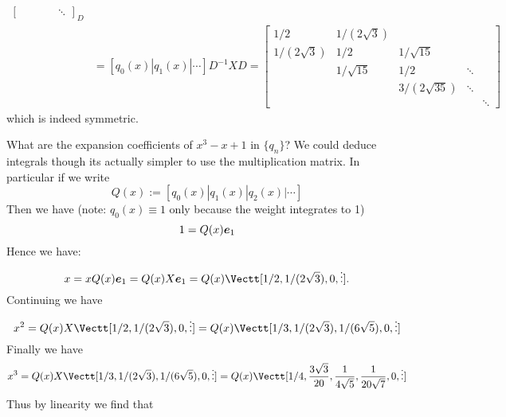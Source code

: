 \begin{example}
\begin{align*}
{\begin{bmatrix}
&&&& \ensuremath{\ddots}
\end{bmatrix}}_D \\
&= [q_0(x)| q_1(x)| \ensuremath{\cdots}] D^{-1} X D =
     \begin{bmatrix} 1/2 & 1/(2\sqrt{3}) \\
                    1/(2\sqrt{3}) & 1/2 &  1/\sqrt{15} \\
                    & 1/\sqrt{15} & 1/2 & \ensuremath{\ddots} \\
                    && 3/(2 \sqrt{35}) &  \ensuremath{\ddots} \\
                    &&& & \ensuremath{\ddots} \end{bmatrix}
\end{align*}
which is indeed symmetric.  \end{example}

\begin{example} What are the expansion coefficients of $x^3 - x + 1$ in $\{q_n\}$? We could deduce integrals though its actually simpler to use the multiplication matrix. In particular if we write
\[
Q(x) := [q_0(x) | q_1(x) | q_2(x) | \ensuremath{\cdots}]
\]
Then we have (note: $q_0(x) \ensuremath{\equiv} 1$ only because the weight integrates to 1)
\[
1 = Q(x) \bm{{\mbox{\boldmath$e$\unboldmath}}}_1
\]
Hence we have:
\[
x = x Q(x) \ensuremath{\bm{\e}}_1 = Q(x) X \ensuremath{\bm{\e}}_1 = Q(x) \Vectt[1/2, 1/(2\sqrt{3}), 0, \ensuremath{\vdots}].
\]
Continuing we have
\[
x^2 = Q(x)  X \Vectt[1/2, 1/(2\sqrt{3}), 0, \ensuremath{\vdots}] = Q(x) \Vectt[1/3, 1/(2 \sqrt{3}),  1/(6\sqrt{5}),0,\ensuremath{\vdots} ]
\]
Finally we have
\[
x^3 = Q(x) X  \Vectt[1/3, 1/(2 \sqrt{3}),  1/(6\sqrt{5}),0,\ensuremath{\vdots} ] =
 Q(x) \Vectt[1/4,{3 \sqrt{3} \over 20}, {1 \over 4 \sqrt{5}}, {1 \over 20 \sqrt{7}}, 0, \ensuremath{\vdots}]
\]
Thus by linearity we find that
\end{example}



